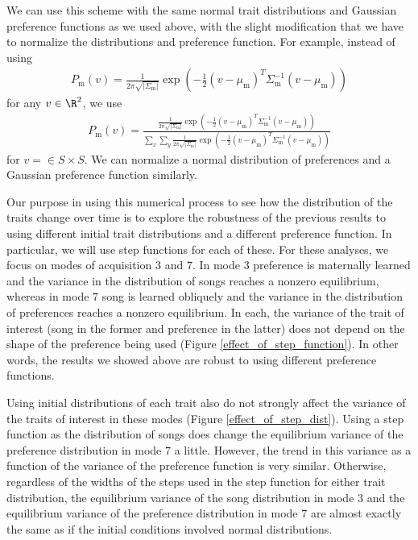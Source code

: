 \documentclass{article}
\newcommand{\x}[1]{\text{#1}}
\begin{document}
We can use this scheme with the same normal trait distributions and Gaussian preference functions as we used above, with the slight modification that we have to normalize the distributions and preference function. For example, instead of using 
\begin{align*}
P_\x{m}(v)=\frac{1}{2\pi\sqrt{|\Sigma_\x{m}|}}\exp\left(-\frac{1}{2}(v-\mu_\x{m})^T\Sigma_\x{m}^{-1}(v-\mu_\x{m})\right)
\end{align*}
for any $v\in\R^2$, we use
\begin{align*}
P_\x{m}(v)=\frac{\frac{1}{2\pi\sqrt{|\Sigma_\x{m}|}}\exp\left(-\frac{1}{2}(v-\mu_\x{m})^T\Sigma_\x{m}^{-1}(v-\mu_\x{m})\right)}{\sum_x\sum_y\frac{1}{2\pi\sqrt{|\Sigma_\x{m}|}}\exp\left(-\frac{1}{2}(v-\mu_\x{m})^T\Sigma_\x{m}^{-1}(v-\mu_\x{m})\right)}
\end{align*}
for $v=\in S\times S$. We can normalize a normal distribution of preferences and a Gaussian preference function similarly. 

Our purpose in using this numerical process to see how the distribution of the traits change over time is to explore the robustness of the previous results to using different initial trait distributions and a different preference function. In particular, we will use step functions for each of these.  
For these analyses, we focus on modes of acquisition $3$ and $7$. In mode $3$ preference is maternally learned and the variance in the distribution of songs reaches a nonzero equilibrium, whereas in mode $7$ song is learned obliquely and the variance in the distribution of preferences reaches a nonzero equilibrium. In each, the variance of the trait of interest (song in the former and preference in the latter) does not depend on the shape of the preference being used (Figure \ref{effect_of_step_function}). In other words, the results we showed above are robust to using different preference functions.

Using initial distributions of each trait also do not strongly affect the variance of the traits of interest in these modes (Figure \ref{effect_of_step_dist}). Using a step function as the distribution of songs does change the equilibrium variance of the preference distribution in mode $7$ a little. However, the trend in this variance as a function of the variance of the preference function is very similar. Otherwise, regardless of the widths of the steps used in the step function for either trait distribution, the equilibrium variance of the song distribution in mode $3$ and the equilibrium variance of the preference distribution in mode $7$ are almost exactly the same as if the initial conditions involved normal distributions. 
\end{document}
